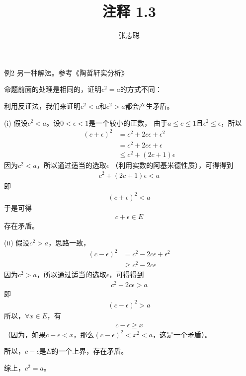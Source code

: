 \documentclass{article}
\begin{document}
\title{注释 1.3}
\author{张志聪}
\maketitle

\begin{zremark}
  例2 另一种解法。参考《陶哲轩实分析》
\end{zremark}

命题前面的处理是相同的，证明$c^2 = a$的方式不同：

利用反证法，我们来证明$c^2 < a$和$c^2 > a$都会产生矛盾。

(i) 假设$c^2 < a$。设$0 < \epsilon < 1$是一个较小的正数，
由于$a \leq c \leq 1$且$\epsilon^2 \leq \epsilon$，所以
\begin{align*}
  (c + \epsilon)^2 & = c^2 + 2c\epsilon + \epsilon^2 \\
                   & = c^2 + 2c\epsilon + \epsilon   \\
                   & \leq c^2 + (2c + 1) \epsilon
\end{align*}
因为$c^2 < a$，所以通过适当的选取$\epsilon$
（利用实数的阿基米德性质），可得得到
\begin{align*}
  c^2 + (2c + 1) \epsilon < a
\end{align*}
即
\begin{align*}
  (c + \epsilon)^2 < a
\end{align*}
于是可得
\begin{align*}
  c + \epsilon \in E
\end{align*}
存在矛盾。

(ii) 假设$c^2 > a$，思路一致，
\begin{align*}
  (c - \epsilon)^2 & = c^2 - 2c\epsilon + \epsilon^2 \\
                   & \geq c^2 - 2c\epsilon
\end{align*}
因为$c^2 > a$，所以通过适当的选取$\epsilon$，可得得到
\begin{align*}
  c^2 - 2c\epsilon > a
\end{align*}
即
\begin{align*}
  (c - \epsilon)^2 > a
\end{align*}
所以，$\forall x \in E$，有
\begin{align*}
  c - \epsilon \geq x
\end{align*}
（因为，如果$c - \epsilon < x$，那么$(c - \epsilon)^2 < x^2 <a$，这是一个矛盾）。

所以，$c - \epsilon$是$E$的一个上界，存在矛盾。

综上，$c^2 = a$。
\end{document}

